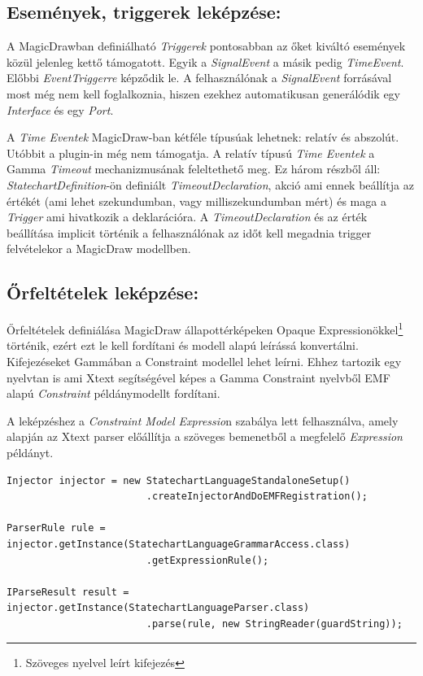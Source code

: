 \subsection{Események, triggerek leképzése:} A MagicDrawban definiálható \emph{Triggerek} pontosabban az őket kiváltó események közül jelenleg kettő támogatott. Egyik a \emph{SignalEvent} a másik pedig \emph{TimeEvent}. Előbbi \emph{EventTriggerre} képződik le. A felhasználónak a \emph{SignalEvent} forrásával most még nem kell foglalkoznia, hiszen ezekhez automatikusan generálódik egy \emph{Interface} és egy \emph{Port}.

A \emph{Time Eventek} MagicDraw-ban kétféle típusúak lehetnek: relatív és abszolút. Utóbbit a plugin-in még nem támogatja.
A relatív típusú \emph{Time Eventek} a Gamma \emph{Timeout} mechanizmusának feleltethető meg. Ez három részből áll: \emph{StatechartDefinition}-ön definiált \emph{TimeoutDeclaration}, akció ami ennek beállítja az értékét (ami lehet szekundumban, vagy milliszekundumban mért) és maga a \emph{Trigger} ami hivatkozik a deklarációra. A \emph{TimeoutDeclaration} és az érték beállítása implicit történik a felhasználónak az időt kell megadnia trigger felvételekor a MagicDraw modellben.

\subsection{Őrfeltételek leképzése:}
Őrfeltételek definiálása MagicDraw állapottérképeken Opaque Expressionökkel\footnote{Szöveges nyelvel leírt kifejezés} történik, ezért ezt le kell fordítani és modell alapú leírássá konvertálni. Kifejezéseket Gammában a Constraint modellel lehet leírni. Ehhez tartozik egy nyelvtan is ami Xtext segítségével képes a Gamma Constraint nyelvből EMF alapú \emph{Constraint} példánymodellt fordítani.

A leképzéshez a \emph{Constraint Model Expressio}n szabálya lett felhasználva, amely alapján az Xtext parser előállítja a szöveges bemenetből a megfelelő \emph{Expression} példányt.
\lstset{style=javacode}
\begin{lstlisting}
Injector injector = new StatechartLanguageStandaloneSetup()
						.createInjectorAndDoEMFRegistration();
						
ParserRule rule = injector.getInstance(StatechartLanguageGrammarAccess.class)
						.getExpressionRule();
						
IParseResult result = injector.getInstance(StatechartLanguageParser.class)
						.parse(rule, new StringReader(guardString));
\end{lstlisting}

